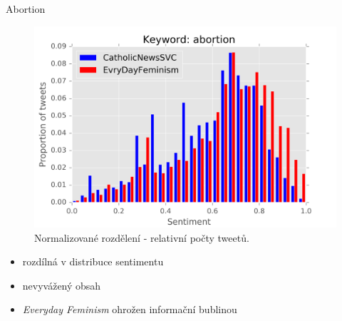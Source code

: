 \documentclass[notheorems,12pt]{beamer}
\begin{document}
\begin{frame}{Abortion}
    \begin{figure}
        \centering
        \includegraphics[scale=0.5]{./Pics/feminismXcatholic-normed.png}
        \caption*{Normalizované rozdělení - relativní počty tweetů.}
    \end{figure}
    \vspace{-0.6cm}
    \begin{itemize}
    	\item rozdílná v distribuce sentimentu
        \item nevyvážený obsah
    	\item \textit{Everyday Feminism} ohrožen informační bublinou
    \end{itemize}
\end{frame}
\end{document}
